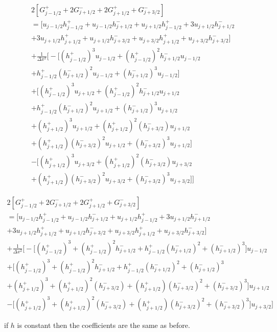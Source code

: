 \documentclass[12pt]{article}
\begin{document}
  \begin{multline}
 2  \left[G^+_{j- 1/2} +  2G^-_{j+ 1/2} +  2G^+_{j+ 1/2}  +  G^-_{j+ 3/2}\right] \\ = \bigg[ u_{j- 1/2}h^+_{j- 1/2} + u_{j- 1/2}h^-_{j+ 1/2}
 +  u_{j+1/2}h^+_{j- 1/2} + 3u_{j+1/2}h^-_{j+ 1/2} \\ + 3u_{j+1/2} h^+_{j+ 1/2}  + u_{j+1/2} h^-_{j+ 3/2}
 +u_{j+ 3/2}h^+_{j+ 1/2} + u_{j+ 3/2}h^-_{j+ 3/2} \bigg]
 \\ +   \frac{1}{\Delta x^2}\bigg[ -\bigg[ \left(h^+_{j- 1/2}\right)^3u_{j- 1/2} + \left(h^+_{j- 1/2}\right)^2h^-_{j+ 1/2} u_{j- 1/2} \\ + h^+_{j- 1/2}\left(h^-_{j+ 1/2}\right)^2u_{j- 1/2} +\left(h^-_{j+ 1/2}\right)^3u_{j- 1/2} \bigg] \\+\bigg[\left(h^+_{j- 1/2}\right)^3u_{j+1/2}  + \left(h^+_{j- 1/2}\right)^2h^-_{j+ 1/2} u_{j+1/2}  \\ + h^+_{j- 1/2}\left(h^-_{j+ 1/2}\right)^2 u_{j+1/2} + \left(h^-_{j+ 1/2}\right)^3  u_{j+1/2} \\ +\left(h^+_{j+ 1/2}\right)^3u_{j+1/2} + \left(h^+_{j+ 1/2}\right)^2\left(h^-_{j+ 3/2}\right)u_{j+1/2} \\ + \left(h^+_{j+ 1/2}\right) \left(h^-_{j+ 3/2}\right)^2u_{j+1/2}  +\left(h^-_{j+ 3/2}\right)^3  u_{j+1/2}  \bigg] \\-\bigg[\left(h^+_{j+ 1/2}\right)^3u_{j+3/2} + \left(h^+_{j+ 1/2}\right)^2\left(h^-_{j+ 3/2}\right)u_{j+3/2} \\ + \left(h^+_{j+ 1/2}\right) \left(h^-_{j+ 3/2}\right)^2u_{j+3/2}  +\left(h^-_{j+ 3/2}\right)^3  u_{j+3/2}  \bigg]   \bigg]
  \end{multline}
  
   \begin{multline}
   2  \left[G^+_{j- 1/2} +  2G^-_{j+ 1/2} +  2G^+_{j+ 1/2}  +  G^-_{j+ 3/2}\right] \\ = \bigg[ u_{j- 1/2}h^+_{j- 1/2} + u_{j- 1/2}h^-_{j+ 1/2}
   +  u_{j+1/2}h^+_{j- 1/2} + 3u_{j+1/2}h^-_{j+ 1/2} \\ + 3u_{j+1/2} h^+_{j+ 1/2}  + u_{j+1/2} h^-_{j+ 3/2}
   +u_{j+ 3/2}h^+_{j+ 1/2} + u_{j+ 3/2}h^-_{j+ 3/2} \bigg]
   \\ + \frac{1}{\Delta x^2} \bigg[ -\bigg[ \left(h^+_{j- 1/2}\right)^3 + \left(h^+_{j- 1/2}\right)^2h^-_{j+ 1/2} + h^+_{j- 1/2}\left(h^-_{j+ 1/2}\right)^2 +\left(h^-_{j+ 1/2}\right)^3 \bigg]u_{j- 1/2} \\+\bigg[\left(h^+_{j- 1/2}\right)^3  + \left(h^+_{j- 1/2}\right)^2h^-_{j+ 1/2}  + h^+_{j- 1/2}\left(h^-_{j+ 1/2}\right)^2  + \left(h^-_{j+ 1/2}\right)^3  \\ +\left(h^+_{j+ 1/2}\right)^3+ \left(h^+_{j+ 1/2}\right)^2\left(h^-_{j+ 3/2}\right) + \left(h^+_{j+ 1/2}\right) \left(h^-_{j+ 3/2}\right)^2  +\left(h^-_{j+ 3/2}\right)^3  \bigg]u_{j+1/2}  \\-\bigg[\left(h^+_{j+ 1/2}\right)^3 + \left(h^+_{j+ 1/2}\right)^2\left(h^-_{j+ 3/2}\right) + \left(h^+_{j+ 1/2}\right) \left(h^-_{j+ 3/2}\right)^2  +\left(h^-_{j+ 3/2}\right)^3    \bigg]u_{j+3/2}   \bigg]
    \end{multline}
    
if $h$ is constant then the coefficients are the same as before. 
 
 
\end{document}
